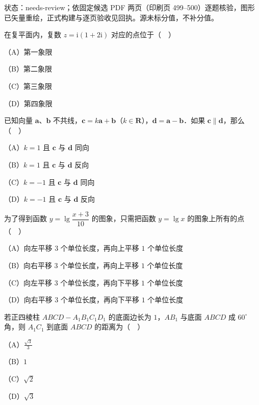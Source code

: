 

状态：needs-review；依固定候选 PDF 两页（印刷页 499–500）逐题核验，图形已矢量重绘，正式构建与逐页验收见回执。源未标分值，不补分值。


\begin{question}
在复平面内，复数 $z=\mathrm i(1+2\mathrm i)$ 对应的点位于（　）

（A）第一象限

（B）第二象限

（C）第三象限

（D）第四象限

\end{question}
\begin{question}
已知向量 $\boldsymbol a$、$\boldsymbol b$ 不共线，$\boldsymbol c=k\boldsymbol a+\boldsymbol b$（$k\in\mathbf R$），$\boldsymbol d=\boldsymbol a-\boldsymbol b$．如果 $\boldsymbol c\parallel\boldsymbol d$，那么（　）

（A）$k=1$ 且 $\boldsymbol c$ 与 $\boldsymbol d$ 同向

（B）$k=1$ 且 $\boldsymbol c$ 与 $\boldsymbol d$ 反向

（C）$k=-1$ 且 $\boldsymbol c$ 与 $\boldsymbol d$ 同向

（D）$k=-1$ 且 $\boldsymbol c$ 与 $\boldsymbol d$ 反向

\end{question}
\begin{question}
为了得到函数 $y=\lg\dfrac{x+3}{10}$ 的图象，只需把函数 $y=\lg x$ 的图象上所有的点（　）

（A）向左平移 $3$ 个单位长度，再向上平移 $1$ 个单位长度

（B）向右平移 $3$ 个单位长度，再向上平移 $1$ 个单位长度

（C）向左平移 $3$ 个单位长度，再向下平移 $1$ 个单位长度

（D）向右平移 $3$ 个单位长度，再向下平移 $1$ 个单位长度

\end{question}
\begin{question}
若正四棱柱 $ABCD-A_1B_1C_1D_1$ 的底面边长为 $1$，$AB_1$ 与底面 $ABCD$ 成 $60^\circ$ 角，则 $A_1C_1$ 到底面 $ABCD$ 的距离为（　）

（A）$\frac{\sqrt3}{3}$

（B）$1$

（C）$\sqrt2$

（D）$\sqrt3$

\end{question}
